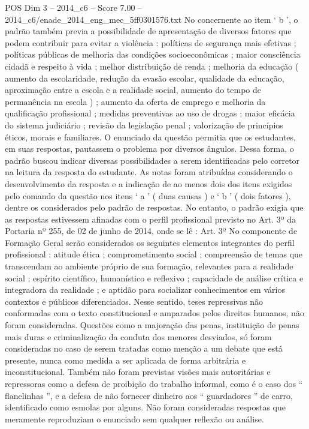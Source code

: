 \begin{textsample}{POS Dim 3 – 2014\_c6 – Score 7.00 – 2014\_c6/enade\_2014\_eng\_mec\_5ff0301576.txt}
No concernente ao item ‘ b ’, o padrão também previa a possibilidade de apresentação de diversos fatores que podem contribuir para evitar a violência : políticas de segurança mais efetivas ; políticas públicas de melhoria das condições socioeconômicas ; maior consciência cidadã e respeito à vida ; melhor distribuição de renda ; melhoria da educação ( aumento da escolaridade, redução da evasão escolar, qualidade da educação, aproximação entre a escola e a realidade social, aumento do tempo de permanência na escola ) ; aumento da oferta de emprego e melhoria da qualificação profissional ; medidas preventivas ao uso de drogas ; maior eficácia do sistema judiciário ; revisão da legislação penal ; valorização de princípios éticos, morais e familiares.
O enunciado da questão permitia que os estudantes, em suas respostas, pautassem o problema por diversos ângulos.
Dessa forma, o padrão buscou indicar diversas possibilidades a serem identificadas pelo corretor na leitura da resposta do estudante.
As notas foram atribuídas considerando o desenvolvimento da resposta e a indicação de ao menos dois dos itens exigidos pelo comando da questão nos itens ‘ a ’ ( duas causas ) e ‘ b ’ ( dois fatores ), dentre os considerados pelo padrão de respostas.
No entanto, o padrão exigia que as respostas estivessem afinadas com o perfil profissional previsto no Art. 3º da Portaria nº 255, de 02 de junho de 2014, onde se lê : Art. 3º No componente de Formação Geral serão considerados os seguintes elementos integrantes do perfil profissional : atitude ética ; comprometimento social ; compreensão de temas que transcendam ao ambiente próprio de sua formação, relevantes para a realidade social ; espírito científico, humanístico e reflexivo ; capacidade de análise crítica e integradora da realidade ; e aptidão para socializar conhecimentos em vários contextos e públicos diferenciados.
Nesse sentido, teses repressivas não conformadas com o texto constitucional e amparados pelos direitos humanos, não foram consideradas.
Questões como a majoração das penas, instituição de penas mais duras e criminalização da conduta dos menores desviados, só foram consideradas no caso de serem tratadas como menção a um debate que está presente, nunca como medida a ser aplicada de forma arbitrária e inconstitucional.
Também não foram previstas visões mais autoritárias e repressoras como a defesa de proibição do trabalho informal, como é o caso dos “ flanelinhas ”, e a defesa de não fornecer dinheiro aos “ guardadores ” de carro, identificado como esmolas por alguns.
Não foram consideradas respostas que meramente reproduziam o enunciado sem qualquer reflexão ou análise.

\end{textsample}
